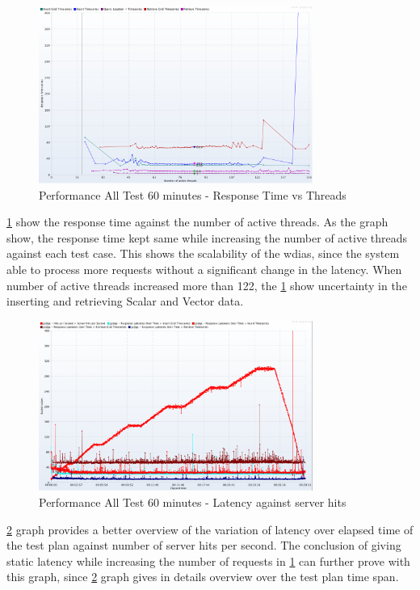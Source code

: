 \begin{figure}[htp]
    \centering
    \includegraphics[width=0.8\textwidth]{results/obs/all/obs_all_60m_response_times_vs_threads.png}
    \caption{Performance All Test 60 minutes - Response Time vs Threads}
    \label{fi:test_obs_all_60m_response_vs_threads}
\end{figure}
\ref{fi:test_obs_all_60m_response_vs_threads} show the response time against the number of active threads. As the graph show, the response time kept same while increasing the number of active threads against each test case. This shows the scalability of the \acrshort{wdias}, since the system able to process more requests without a significant change in the latency.
When number of active threads increased more than 122, the \ref{fi:test_obs_all_60m_response_vs_threads} show uncertainty in the inserting and retrieving Scalar and Vector data.

\begin{figure}[htp]
    \centering
    \includegraphics[width=0.8\textwidth]{results/obs/all/obs_all_60m_res_latencies_against_hits.png}
    \caption{Performance All Test 60 minutes - Latency against server hits}
    \label{fi:test_obs_all_60m_latency}
\end{figure}
\ref{fi:test_obs_all_60m_latency} graph provides a better overview of the variation of latency over elapsed time of the test plan against number of server hits per second.
The conclusion of giving static latency while increasing the number of requests in \ref{fi:test_obs_all_60m_response_vs_threads} can further prove with this graph, since \ref{fi:test_obs_all_60m_latency} graph gives in details overview over the test plan time span.



